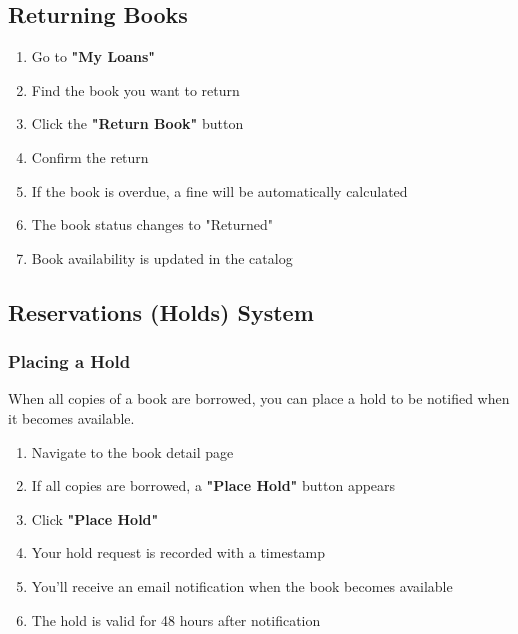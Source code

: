\documentclass[12pt,a4paper]{article}
\begin{document}
\subsection{Returning Books}
\begin{enumerate}[leftmargin=*]
    \item Go to \textbf{"My Loans"}
    \item Find the book you want to return
    \item Click the \textbf{"Return Book"} button
    \item Confirm the return
    \item If the book is overdue, a fine will be automatically calculated
    \item The book status changes to "Returned"
    \item Book availability is updated in the catalog
\end{enumerate}

\newpage

\subsection{Reservations (Holds) System}

\subsubsection{Placing a Hold}
When all copies of a book are borrowed, you can place a hold to be notified when it becomes available.

\begin{enumerate}[leftmargin=*]
    \item Navigate to the book detail page
    \item If all copies are borrowed, a \textbf{"Place Hold"} button appears
    \item Click \textbf{"Place Hold"}
    \item Your hold request is recorded with a timestamp
    \item You'll receive an email notification when the book becomes available
    \item The hold is valid for 48 hours after notification
\end{enumerate}
\end{document}
